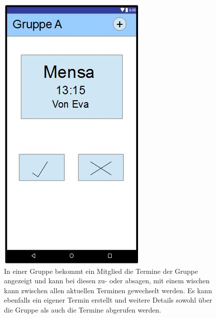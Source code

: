 \documentclass{scrartcl}
\begin{document}
	\newpage
	\begin{figure}[h]
		\centering
		\includegraphics[width=.5\textwidth]{GUI_Gruppe.jpg}
		\caption{In einer Gruppe bekommt ein  \gls{Mitglied} die Termine der Gruppe angezeigt und kann bei diesen zu- oder absagen, mit einem wischen kann zwischen allen aktuellen Terminen gewechselt werden. Es kann ebenfalls ein eigener Termin erstellt und weitere Details sowohl über die Gruppe als auch die Termine abgerufen werden.}
	\end{figure}
	
\end{document}

